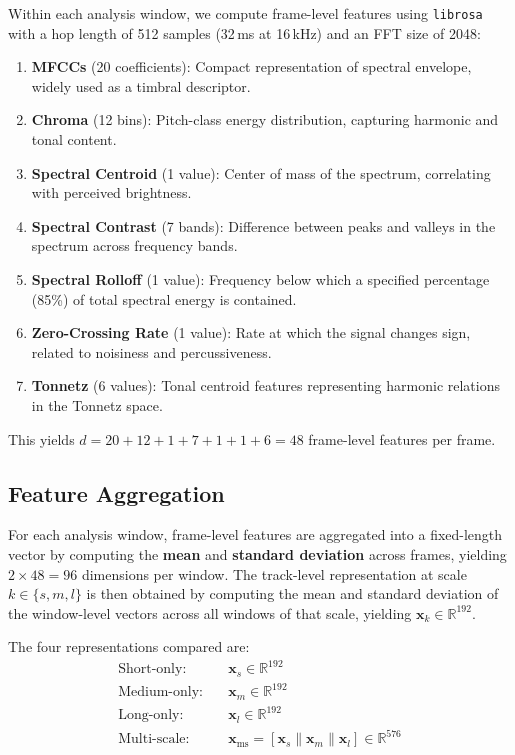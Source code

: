 \documentclass[conference]{IEEEtran}
\begin{document}
Within each analysis window, we compute frame-level features using \texttt{librosa} with a hop length of 512 samples (32\,ms at 16\,kHz) and an FFT size of 2048:

\begin{enumerate}
    \item \textbf{MFCCs} (20 coefficients): Compact representation of spectral envelope, widely used as a timbral descriptor.
    \item \textbf{Chroma} (12 bins): Pitch-class energy distribution, capturing harmonic and tonal content.
    \item \textbf{Spectral Centroid} (1 value): Center of mass of the spectrum, correlating with perceived brightness.
    \item \textbf{Spectral Contrast} (7 bands): Difference between peaks and valleys in the spectrum across frequency bands.
    \item \textbf{Spectral Rolloff} (1 value): Frequency below which a specified percentage (85\%) of total spectral energy is contained.
    \item \textbf{Zero-Crossing Rate} (1 value): Rate at which the signal changes sign, related to noisiness and percussiveness.
    \item \textbf{Tonnetz} (6 values): Tonal centroid features representing harmonic relations in the Tonnetz space.
\end{enumerate}

This yields $d = 20 + 12 + 1 + 7 + 1 + 1 + 6 = 48$ frame-level features per frame.

\subsection{Feature Aggregation}

For each analysis window, frame-level features are aggregated into a fixed-length vector by computing the \textbf{mean} and \textbf{standard deviation} across frames, yielding $2 \times 48 = 96$ dimensions per window.
The track-level representation at scale $k \in \{s, m, l\}$ is then obtained by computing the mean and standard deviation of the window-level vectors across all windows of that scale, yielding $\mathbf{x}_k \in \mathbb{R}^{192}$.

The four representations compared are:
\begin{align}
    \text{Short-only:} \quad & \mathbf{x}_s \in \mathbb{R}^{192} \\
    \text{Medium-only:} \quad & \mathbf{x}_m \in \mathbb{R}^{192} \\
    \text{Long-only:} \quad & \mathbf{x}_l \in \mathbb{R}^{192} \\
    \text{Multi-scale:} \quad & \mathbf{x}_{\text{ms}} = [\mathbf{x}_s \| \mathbf{x}_m \| \mathbf{x}_l] \in \mathbb{R}^{576}
\end{align}
\end{document}
